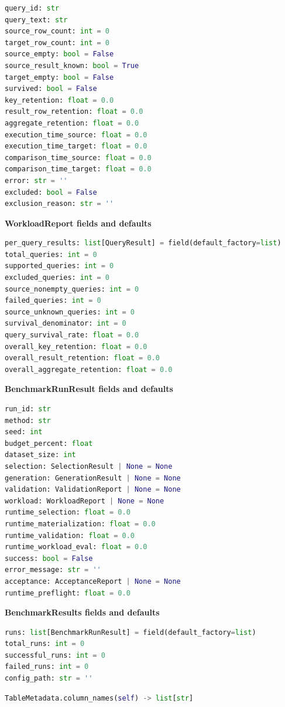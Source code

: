 \begin{lstlisting}[language=Python]
query_id: str
query_text: str
source_row_count: int = 0
target_row_count: int = 0
source_empty: bool = False
source_result_known: bool = True
target_empty: bool = False
survived: bool = False
key_retention: float = 0.0
result_row_retention: float = 0.0
aggregate_retention: float = 0.0
execution_time_source: float = 0.0
execution_time_target: float = 0.0
comparison_time_source: float = 0.0
comparison_time_target: float = 0.0
error: str = ''
excluded: bool = False
exclusion_reason: str = ''
\end{lstlisting}


\textbf{WorkloadReport fields and defaults}


\begin{lstlisting}[language=Python]
per_query_results: list[QueryResult] = field(default_factory=list)
total_queries: int = 0
supported_queries: int = 0
excluded_queries: int = 0
source_nonempty_queries: int = 0
failed_queries: int = 0
source_unknown_queries: int = 0
survival_denominator: int = 0
query_survival_rate: float = 0.0
overall_key_retention: float = 0.0
overall_result_retention: float = 0.0
overall_aggregate_retention: float = 0.0
\end{lstlisting}


\textbf{BenchmarkRunResult fields and defaults}


\begin{lstlisting}[language=Python]
run_id: str
method: str
seed: int
budget_percent: float
dataset_size: int
selection: SelectionResult | None = None
generation: GenerationResult | None = None
validation: ValidationReport | None = None
workload: WorkloadReport | None = None
runtime_selection: float = 0.0
runtime_materialization: float = 0.0
runtime_validation: float = 0.0
runtime_workload_eval: float = 0.0
success: bool = False
error_message: str = ''
acceptance: AcceptanceReport | None = None
runtime_preflight: float = 0.0
\end{lstlisting}


\textbf{BenchmarkResults fields and defaults}


\begin{lstlisting}[language=Python]
runs: list[BenchmarkRunResult] = field(default_factory=list)
total_runs: int = 0
successful_runs: int = 0
failed_runs: int = 0
config_path: str = ''
\end{lstlisting}




\begin{lstlisting}[language=Python]
TableMetadata.column_names(self) -> list[str]
\end{lstlisting}



